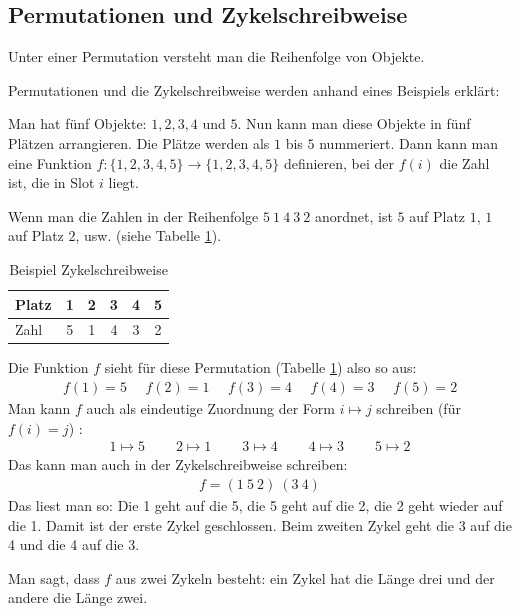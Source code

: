 \documentclass[12pt,a4paper, usenames, dvipsnames]{article}
\begin{document}
\subsection*{Permutationen und Zykelschreibweise} 
\label{11}
Unter einer Permutation versteht man die Reihenfolge von Objekte.

Permutationen und die Zykelschreibweise werden anhand eines Beispiels erklärt: 

Man hat fünf Objekte: $1, 2, 3, 4$ und $5$. Nun kann man diese Objekte in fünf Plätzen arrangieren. Die Plätze werden als $1$ bis $5$ nummeriert. Dann kann man eine Funktion $f:\{1,2,3,4,5\} \rightarrow \{1,2,3,4,5\}$ definieren, bei der $f(i)$ die Zahl ist, die in Slot $i$ liegt.

Wenn man die Zahlen in der Reihenfolge $5 \ 1\ 4\ 3 \ 2$ anordnet, ist $5$ auf Platz $1$, $1$ auf Platz $2$, usw. (siehe Tabelle \ref{9}). 

\begin{table}[h]
\centering
\begin{tabular}{l ccccc}
Platz & 1 & 2 & 3 & 4 & 5 \\
\hline
Zahl & 5 & 1 & 4 & 3 & 2 \\
\end{tabular}
\caption{Beispiel Zykelschreibweise}
\label{9}
\end{table}
Die Funktion $f$ sieht für diese Permutation (Tabelle \ref{9}) also so aus:
\begin{align*}
f(1) = 5 \ \ \ \ \ \  f(2) = 1 \ \ \ \ \ \ f(3) = 4 \ \ \ \ \ \ f(4) = 3 \ \ \ \ \ \ f(5) = 2 
\end{align*}
Man kann $f$ auch als eindeutige Zuordnung der Form $i \mapsto j$ schreiben (für $f(i)=j$) \cite{JC}:
\begin{align*}
1 \mapsto 5 \ \ \ \ \ \ \ \ \ \  2\mapsto 1 \ \ \ \ \ \ \ \ \ \ 3\mapsto 4 \ \ \ \ \ \ \ \ \ \ 4\mapsto 3 \ \ \ \ \ \ \ \ \ \ 5\mapsto 2 
\end{align*}
Das kann man auch in der Zykelschreibweise schreiben:
\begin{align*}
f = (1 \ 5 \ 2)\ (3 \ 4)
\end{align*}
Das liest man so: Die 1 geht auf die 5, die 5 geht auf die 2, die 2 geht wieder auf die 1. Damit ist der erste Zykel geschlossen. Beim zweiten Zykel geht die 3 auf die 4 und die 4 auf die 3.

Man sagt, dass $f$ aus zwei Zykeln besteht: ein Zykel hat die Länge drei und der andere die Länge zwei.
\end{document}
